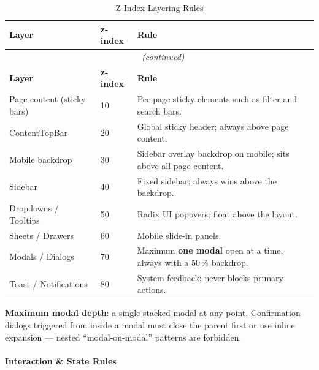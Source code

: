 \begin{longtable}{|p{}|p{}|p{}|}
  \caption{Z-Index Layering Rules} \label{tab:zindex_rules} \\
  \hline
  \textbf{Layer} & \textbf{z-index} & \textbf{Rule} \\
  \hline
  \endfirsthead
  \multicolumn{3}{c}{\small\tablename~\thetable{} \textit{(continued)}} \\
  \hline
  \textbf{Layer} & \textbf{z-index} & \textbf{Rule} \\
  \hline
  \endhead
  \hline
  \endfoot
  Page content (sticky bars) & 10 & Per-page sticky elements such as filter and search bars. \\
  \hline
  ContentTopBar & 20 & Global sticky header; always above page content. \\
  \hline
  Mobile backdrop & 30 & Sidebar overlay backdrop on mobile; sits above all page content. \\
  \hline
  Sidebar & 40 & Fixed sidebar; always wins above the backdrop. \\
  \hline
  Dropdowns / Tooltips & 50 & Radix UI popovers; float above the layout. \\
  \hline
  Sheets / Drawers & 60 & Mobile slide-in panels. \\
  \hline
  Modals / Dialogs & 70 & Maximum \textbf{one modal} open at a time, always with a 50\,\% backdrop. \\
  \hline
  Toast / Notifications & 80 & System feedback; never blocks primary actions. \\
  \hline
\end{longtable}

\textbf{Maximum modal depth}: a single stacked modal at any point. Confirmation dialogs triggered from inside a modal must close the parent first or use inline expansion --- nested ``modal-on-modal'' patterns are forbidden.

\paragraph{Interaction \& State Rules}

